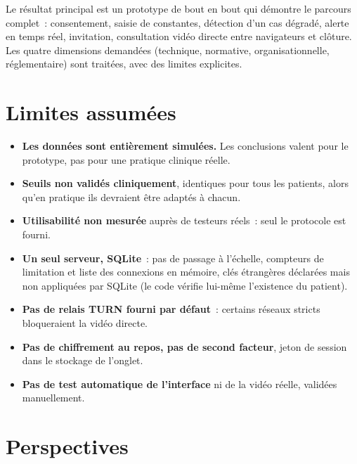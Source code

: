 Le résultat principal est un prototype de bout en bout qui démontre le parcours complet~: consentement, saisie de constantes, détection d'un cas dégradé, alerte en temps réel, invitation, consultation vidéo directe entre navigateurs et clôture. Les quatre dimensions demandées (technique, normative, organisationnelle, réglementaire) sont traitées, avec des limites explicites.

\section{Limites assumées}

\begin{itemize}
  \item \textbf{Les données sont entièrement simulées.} Les conclusions valent pour le prototype, pas pour une pratique clinique réelle.
  \item \textbf{Seuils non validés cliniquement}, identiques pour tous les patients, alors qu'en pratique ils devraient être adaptés à chacun.
  \item \textbf{Utilisabilité non mesurée} auprès de testeurs réels~: seul le protocole est fourni.
  \item \textbf{Un seul serveur, SQLite}~: pas de passage à l'échelle, compteurs de limitation et liste des connexions en mémoire, clés étrangères déclarées mais non appliquées par SQLite (le code vérifie lui-même l'existence du patient).
  \item \textbf{Pas de relais TURN fourni par défaut}~: certains réseaux stricts bloqueraient la vidéo directe.
  \item \textbf{Pas de chiffrement au repos, pas de second facteur}, jeton de session dans le stockage de l'onglet.
  \item \textbf{Pas de test automatique de l'interface} ni de la vidéo réelle, validées manuellement.
\end{itemize}

\section{Perspectives}


